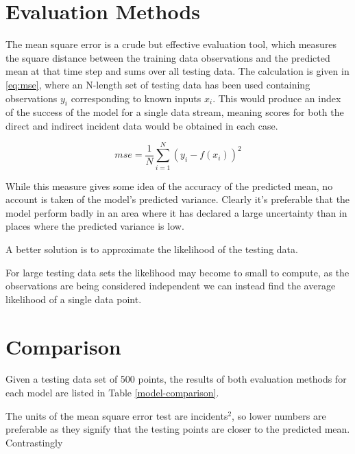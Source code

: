 \documentclass[a4paper,11pt]{report}
\begin{document}
\section{Evaluation Methods}
The mean square error is a crude but effective evaluation tool, which measures the square distance between the training data observations and the predicted mean at that time step and sums over all testing data. The calculation is given in \ref{eq:mse}, where an N-length set of testing data has been used containing observations \(y_i\) corresponding to known inputs \(x_i\). This would produce an index of the success of the model for a single data stream, meaning scores for both the direct and indirect incident data would be obtained in each case. 

\begin{equation} \label{eq:mse}
mse = \frac{1}{N} \sum_{i=1}^{N} (y_i - f(x_i))^2
\end{equation}

While this measure gives some idea of the accuracy of the predicted mean, no account is taken of the model's predicted variance. Clearly it's preferable that the model perform badly in an area where it has declared a large uncertainty than in places where the predicted variance is low. \par

A better solution is to approximate the likelihood of the testing data. 

For large testing data sets the likelihood may become to small to compute, as the observations are being considered independent we can instead find the average likelihood of a single data point.

\section{Comparison}

Given a testing data set of 500 points, the results of both evaluation methods for each model are listed in Table \ref{model-comparison}. \par

The units of the mean square error test are incidents\(^2\), so lower numbers are preferable as they signify that the testing points are closer to the predicted mean. Contrastingly 
\end{document}
